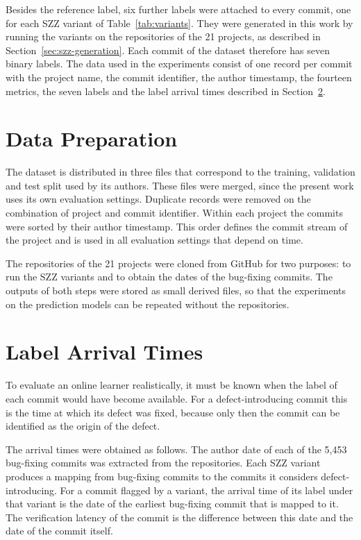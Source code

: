 \documentclass[12pt,a4paper,oneside]{report}
\begin{document}
Besides the reference label, six further labels were attached to every
commit, one for each SZZ variant of Table~\ref{tab:variants}. They were
generated in this work by running the variants on the repositories of the 21
projects, as described in Section~\ref{sec:szz-generation}. Each commit of the
dataset therefore has seven binary labels. The data used in the experiments
consist of one record per commit with the project name, the commit
identifier, the author timestamp, the fourteen metrics, the seven labels and
the label arrival times described in Section~\ref{sec:latency-data}.

\section{Data Preparation}

The dataset is distributed in three files that correspond to the training,
validation and test split used by its authors. These files were merged, since
the present work uses its own evaluation settings. Duplicate records were
removed on the combination of project and commit identifier. Within each
project the commits were sorted by their author timestamp. This order defines
the commit stream of the project and is used in all evaluation settings that
depend on time.

The repositories of the 21 projects were cloned from GitHub for two purposes:
to run the SZZ variants and to obtain the dates of the bug-fixing commits.
The outputs of both steps were stored as small derived files, so that the
experiments on the prediction models can be repeated without the repositories.

\section{Label Arrival Times}\label{sec:latency-data}

To evaluate an online learner realistically, it must be known when the label
of each commit would have become available. For a defect-introducing commit
this is the time at which its defect was fixed, because only then the commit
can be identified as the origin of the defect.

The arrival times were obtained as follows. The author date of each of the
5,453 bug-fixing commits was extracted from the repositories. Each SZZ
variant produces a mapping from bug-fixing commits to the commits it
considers defect-introducing. For a commit flagged by a variant, the arrival
time of its label under that variant is the date of the earliest bug-fixing
commit that is mapped to it. The verification latency of the commit is the
difference between this date and the date of the commit itself.
\end{document}
